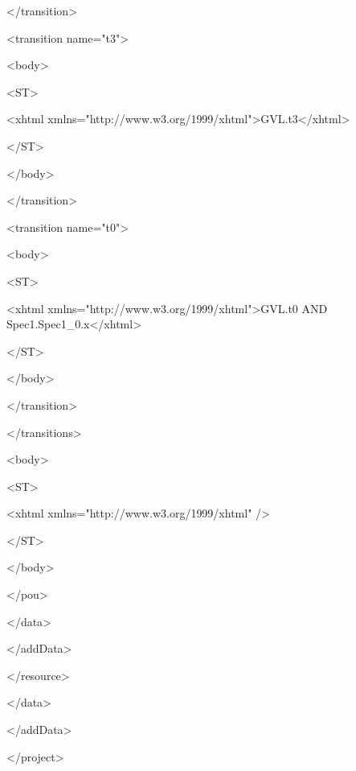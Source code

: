 {</transition>

<transition name="t3">

 <body>

  <ST>

   <xhtml xmlns="http://www.w3.org/1999/xhtml">GVL.t3</xhtml>

  </ST>

 </body>

</transition>

<transition name="t0">

 <body>

  <ST>

   <xhtml xmlns="http://www.w3.org/1999/xhtml">GVL.t0 AND Spec1.Spec1\_0.x</xhtml>

  </ST>

 </body>

</transition>

</transitions>

<body>

<ST>

 <xhtml xmlns="http://www.w3.org/1999/xhtml" />

</ST>

</body>

</pou>

</data>

</addData>

</resource>

</data>

</addData>

</project>
}
